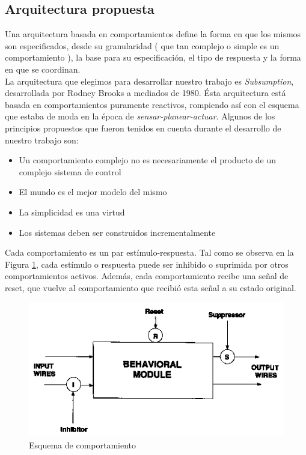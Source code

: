 \newpage
\subsection{Arquitectura propuesta}
\label{arq_prop}
Una arquitectura basada en comportamientos define la forma en que los mismos son especificados, desde
su granularidad ( que tan complejo o simple es un comportamiento ), la base para su especificaci\'on,
el tipo de respuesta y la forma en que se coordinan.
\\
La arquitectura que elegimos para desarrollar nuestro trabajo es \emph{Subsumption}, desarrollada por
Rodney Brooks a mediados de 1980. \'Esta arquitectura est\'a basada en comportamientos puramente reactivos,
rompiendo as\'i con el esquema que estaba de moda en la \'epoca de \emph{sensar-planear-actuar}. Algunos
de los principios propuestos que fueron tenidos en cuenta durante el desarrollo de nuestro trabajo son:
\begin{itemize}
\item{}Un comportamiento complejo no es necesariamente el producto de un complejo sistema de control
\item{}El mundo es el mejor modelo del mismo
\item{}La simplicidad es una virtud
\item{}Los sistemas deben ser construidos incrementalmente
\end{itemize}
Cada comportamiento es un par est\'imulo-respuesta. Tal como se observa en la Figura \ref{fig:behaviour},
cada est\'imulo o respuesta puede ser inhibido o suprimida por otros comportamientos activos.
Adem\'as, cada comportamiento recibe una se\~nal de reset, que vuelve al comportamiento que
recibi\'o esta se\~nal a su estado original.
\begin{figure}[htp]
\begin{center}
\includegraphics[scale=0.85]{comportamientos/behaviour.png}
\caption{Esquema de comportamiento}
\label{fig:behaviour}
\end{center}
\end{figure}
